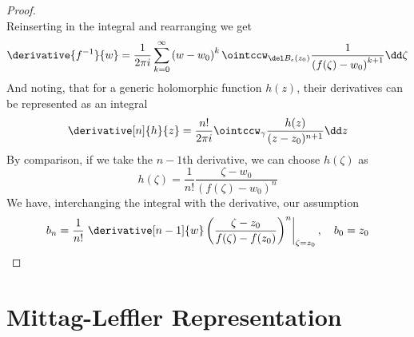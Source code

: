 \documentclass[../mmf.tex]{subfiles}
\begin{document}
\begin{proof}
\begin{equation*}
	\end{equation*}
	Reinserting in the integral and rearranging we get
	\begin{equation*}
		\derivative{f^{-1}}{w}=\frac{1}{2\pi i}\sum_{k=0}^{\infty}\left( w-w_0 \right)^k\ointccw_{\del B_{\epsilon}(z_0)}\frac{1}{\left( f(\zeta)-w_0 \right)^{k+1}}\dd\zeta
	\end{equation*}
	And noting, that for a generic holomorphic function $h(z)$, their derivatives can be represented as an integral
	\begin{equation*}
		\derivative[n]{h}{z}=\frac{n!}{2\pi i}\ointccw_\gamma\frac{h(z)}{(z-z_0)^{n+1}}\dd z
	\end{equation*}
	By comparison, if we take the $n-1$th derivative, we can choose $h(\zeta)$ as
	\begin{equation*}
		h(\zeta)=\frac{1}{n!}\frac{\zeta-w_0}{\left( f(\zeta)-w_0 \right)^n}
	\end{equation*}
	We have, interchanging the integral with the derivative, our assumption
	\begin{equation*}
		b_n=\frac{1}{n!}\left.\derivative[n-1]{w}\left( \frac{\zeta-z_0}{f(\zeta)-f(z_0)} \right)^n\right|_{\zeta=z_0}, \quad b_0=z_0
	\end{equation*}
\end{proof}
\section{Mittag-Leffler Representation}
\end{document}
